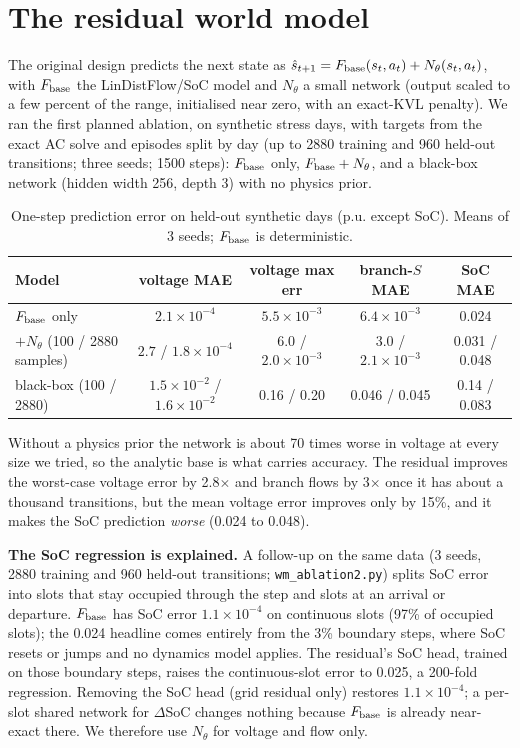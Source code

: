\documentclass[10pt]{article}
\begin{document}
\section{The residual world model}\label{sec:wm}
The original design predicts the next state as $\hat s_{t+1}=F_{\rm base}(s_t,a_t)+N_\theta(s_t,a_t)$, with $F_{\rm base}$ the LinDistFlow/SoC model and $N_\theta$ a small network (output scaled to a few percent of the range, initialised near zero, with an exact-KVL penalty). We ran the first planned ablation, on synthetic stress days, with targets from the exact AC solve and episodes split by day (up to 2880 training and 960 held-out transitions; three seeds; 1500 steps): $F_{\rm base}$ only, $F_{\rm base}+N_\theta$, and a black-box network (hidden width 256, depth 3) with no physics prior.
\begin{table}[h]\centering\small\begin{tabular}{lcccc}
Model & voltage MAE & voltage max err & branch-$S$ MAE & SoC MAE\\\hline
$F_{\rm base}$ only & $2.1\times10^{-4}$ & $5.5\times10^{-3}$ & $6.4\times10^{-3}$ & 0.024\\
$+N_\theta$ (100 / 2880 samples) & $2.7$ / $1.8\times10^{-4}$ & $6.0$ / $2.0\times10^{-3}$ & $3.0$ / $2.1\times10^{-3}$ & 0.031 / 0.048\\
black-box (100 / 2880) & $1.5\times10^{-2}$ / $1.6\times10^{-2}$ & 0.16 / 0.20 & 0.046 / 0.045 & 0.14 / 0.083
\end{tabular}\caption{One-step prediction error on held-out synthetic days (p.u. except SoC). Means of 3 seeds; $F_{\rm base}$ is deterministic.}\label{tab:wm}\end{table}
Without a physics prior the network is about 70 times worse in voltage at every size we tried, so the analytic base is what carries accuracy. The residual improves the worst-case voltage error by 2.8$\times$ and branch flows by 3$\times$ once it has about a thousand transitions, but the mean voltage error improves only by 15\%, and it makes the SoC prediction \emph{worse} (0.024 to 0.048).

\textbf{The SoC regression is explained.} A follow-up on the same data (3 seeds, 2880 training and 960 held-out transitions; \texttt{wm\_ablation2.py}) splits SoC error into slots that stay occupied through the step and slots at an arrival or departure. $F_{\rm base}$ has SoC error $1.1\times10^{-4}$ on continuous slots (97\% of occupied slots); the 0.024 headline comes entirely from the 3\% boundary steps, where SoC resets or jumps and no dynamics model applies. The residual's SoC head, trained on those boundary steps, raises the continuous-slot error to 0.025, a 200-fold regression. Removing the SoC head (grid residual only) restores $1.1\times10^{-4}$; a per-slot shared network for $\Delta$SoC changes nothing because $F_{\rm base}$ is already near-exact there. We therefore use $N_\theta$ for voltage and flow only.
\end{document}
